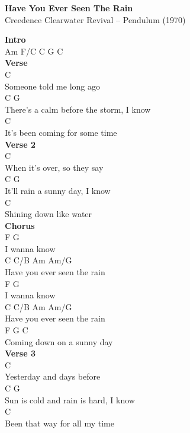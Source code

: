 \documentclass[a4paper]{article}
\begin{document}
    \begin{center}
        \textbf{Have You Ever Seen The Rain}
        ~\\
        Creedence Clearwater Revival -- Pendulum (1970)
    \end{center}
    {
        \scriptsize
        \textbf{Intro}
        ~\\
        {
            \cutive
            \obeyspaces
Am    F/C    C    G    C
\\

        }
        \textbf{Verse}
        ~\\
        {
            \cutive
            \obeyspaces
C
\\
Someone told me long ago
\\
C                                   G
\\
There's a calm before the storm, I know
\\
                   C
\\
It's been coming for some time
\\

        }
        \textbf{Verse 2}
        ~\\
        {
            \cutive
            \obeyspaces
C
\\
When it's over, so they say
\\
C                          G
\\
It'll rain a sunny day, I know
\\
                   C
\\
Shining down like water 
\\

        }
        \textbf{Chorus}
        ~\\
        {
            \cutive
            \obeyspaces
F         G
\\
I wanna know
\\
         C    C/B      Am    Am/G
\\
Have you ever seen the rain
\\
F         G
\\
I wanna know
\\
         C    C/B      Am    Am/G
\\
Have you ever seen the rain
\\
F        G               C
\\
Coming down on a sunny day
\\

        }
        \textbf{Verse 3}
        ~\\
        {
            \cutive
            \obeyspaces
C
\\
Yesterday and days before
\\
C                                G
\\
Sun is cold and rain is hard, I know
\\
                    C
\\
Been that way for all my time
\\

}}
\end{document}
